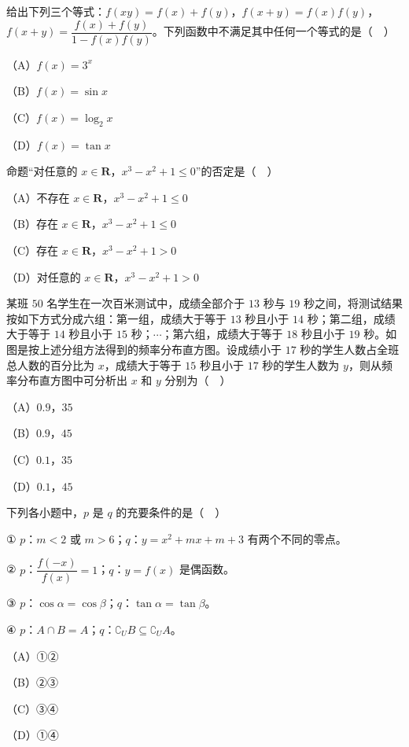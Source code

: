\begin{question}
给出下列三个等式：$f(xy)=f(x)+f(y)$，$f(x+y)=f(x)f(y)$，$f(x+y)=\dfrac{f(x)+f(y)}{1-f(x)f(y)}$。下列函数中不满足其中任何一个等式的是（　）

（A）$f(x)=3^x$

（B）$f(x)=\sin x$

（C）$f(x)=\log_2 x$

（D）$f(x)=\tan x$

\end{question}
\begin{question}
命题“对任意的 $x\in\mathbf R$，$x^3-x^2+1\leqslant0$”的否定是（　）

（A）不存在 $x\in\mathbf R$，$x^3-x^2+1\leqslant0$

（B）存在 $x\in\mathbf R$，$x^3-x^2+1\leqslant0$

（C）存在 $x\in\mathbf R$，$x^3-x^2+1>0$

（D）对任意的 $x\in\mathbf R$，$x^3-x^2+1>0$

\Needspace{0.4\textheight}
\end{question}
\begingroup
\renewenvironment{question}{\Needspace{0.5\textheight}}{}
\begin{question}
某班 $50$ 名学生在一次百米测试中，成绩全部介于 $13$ 秒与 $19$ 秒之间，将测试结果按如下方式分成六组：第一组，成绩大于等于 $13$ 秒且小于 $14$ 秒；第二组，成绩大于等于 $14$ 秒且小于 $15$ 秒；$\cdots$；第六组，成绩大于等于 $18$ 秒且小于 $19$ 秒。如图是按上述分组方法得到的频率分布直方图。设成绩小于 $17$ 秒的学生人数占全班总人数的百分比为 $x$，成绩大于等于 $15$ 秒且小于 $17$ 秒的学生人数为 $y$，则从频率分布直方图中可分析出 $x$ 和 $y$ 分别为（　）
\nopagebreak[4]
\begin{center}\end{center}
\nopagebreak[4]
（A）$0.9$，$35$

（B）$0.9$，$45$

（C）$0.1$，$35$

（D）$0.1$，$45$

\end{question}
\endgroup
\begin{question}
下列各小题中，$p$ 是 $q$ 的充要条件的是（　）

① $p$：$m<2$ 或 $m>6$；$q$：$y=x^2+mx+m+3$ 有两个不同的零点。

② $p$：$\dfrac{f(-x)}{f(x)}=1$；$q$：$y=f(x)$ 是偶函数。

③ $p$：$\cos\alpha=\cos\beta$；$q$：$\tan\alpha=\tan\beta$。

④ $p$：$A\cap B=A$；$q$：$\complement_U B\subseteq\complement_U A$。

（A）①②

（B）②③

（C）③④

（D）①④

\Needspace{0.4\textheight}
\end{question}
